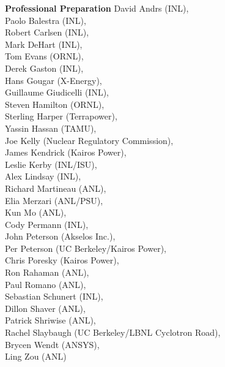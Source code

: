 \documentclass[11pt,letterpaper,english]{article}
\begin{document}
\begin{flushleft} {\bf Professional Preparation}
{David Andrs (INL),\\
Paolo Balestra (INL),\\
Robert Carlsen (INL),\\
Mark DeHart (INL),\\
Tom Evans (ORNL),\\
Derek Gaston (INL),\\
Hans Gougar (X-Energy),\\
Guillaume Giudicelli (INL),\\
Steven Hamilton (ORNL),\\
Sterling Harper (Terrapower),\\
Yassin Hassan (TAMU),\\
Joe Kelly (Nuclear Regulatory Commission),\\
James Kendrick (Kairos Power),\\
Leslie Kerby (INL/ISU),\\
Alex Lindsay (INL),\\
Richard Martineau (ANL),\\
Elia Merzari (ANL/PSU),\\
Kun Mo (ANL),\\
Cody Permann (INL),\\
John Peterson (Akselos Inc.),\\
Per Peterson (UC Berkeley/Kairos Power),\\
Chris Poresky (Kairos Power),\\
Ron Rahaman (ANL),\\
Paul Romano (ANL),\\
Sebastian Schunert (INL),\\
Dillon Shaver (ANL),\\
Patrick Shriwise (ANL),\\
Rachel Slaybaugh (UC Berkeley/LBNL Cyclotron Road),\\
Brycen Wendt (ANSYS),\\
Ling Zou (ANL)
}


\end{flushleft}
\end{document}
